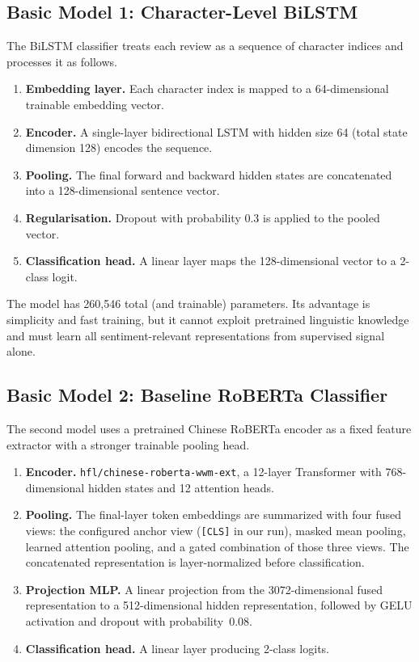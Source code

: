 \documentclass{article}
\begin{document}
\subsection{Basic Model 1: Character-Level BiLSTM}
\label{sec:bilstm}

The BiLSTM classifier treats each review as a sequence of character indices and
processes it as follows.

\begin{enumerate}
  \item \textbf{Embedding layer.}  Each character index is mapped to a
    64-dimensional trainable embedding vector.
  \item \textbf{Encoder.}  A single-layer bidirectional LSTM with hidden size
    64 (total state dimension 128) encodes the sequence.
  \item \textbf{Pooling.}  The final forward and backward hidden states are
    concatenated into a 128-dimensional sentence vector.
  \item \textbf{Regularisation.}  Dropout with probability 0.3 is applied to
    the pooled vector.
  \item \textbf{Classification head.}  A linear layer maps the 128-dimensional
    vector to a 2-class logit.
\end{enumerate}

The model has 260{,}546 total (and trainable) parameters.  Its advantage is
simplicity and fast training, but it cannot exploit pretrained linguistic
knowledge and must learn all sentiment-relevant representations from supervised
signal alone.

\subsection{Basic Model 2: Baseline RoBERTa Classifier}
\label{sec:bert-baseline}

The second model uses a pretrained Chinese RoBERTa encoder \citep{cui2020revisiting}
as a fixed feature extractor with a stronger trainable pooling head.

\begin{enumerate}
  \item \textbf{Encoder.}  \texttt{hfl/chinese-roberta-wwm-ext}, a 12-layer
    Transformer with 768-dimensional hidden states and 12 attention heads.
  \item \textbf{Pooling.}  The final-layer token embeddings are summarized with
    four fused views: the configured anchor view (\texttt{[CLS]} in our run),
    masked mean pooling, learned attention pooling, and a gated combination of
    those three views.  The concatenated representation is layer-normalized
    before classification.
  \item \textbf{Projection MLP.}  A linear projection from the 3072-dimensional
    fused representation to a 512-dimensional hidden representation, followed
    by GELU activation and dropout with probability~0.08.
  \item \textbf{Classification head.}  A linear layer producing 2-class logits.
\end{enumerate}
\end{document}

